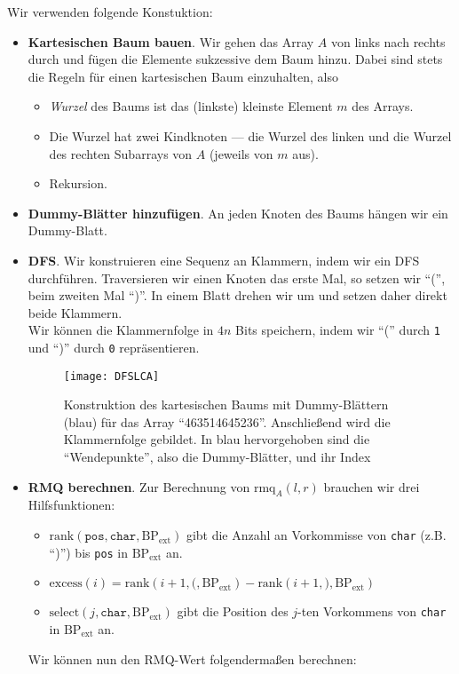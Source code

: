 Wir verwenden folgende Konstuktion:

\begin{itemize}
  \item \textbf{Kartesischen Baum bauen}. \quad Wir gehen das Array \( A \) von links nach rechts durch und fügen die Elemente sukzessive dem Baum hinzu. Dabei sind stets die Regeln für einen kartesischen Baum einzuhalten, also
  \begin{itemize}
    \item \emph{Wurzel} des Baums ist das (linkste) kleinste Element \( m \) des Arrays.
    \item Die Wurzel hat zwei Kindknoten --- die Wurzel des linken und die Wurzel des rechten Subarrays von \( A \) (jeweils von \( m \) aus).
    \item Rekursion.
  \end{itemize}
  \item \textbf{Dummy-Blätter hinzufügen}. \quad An jeden Knoten des Baums hängen wir ein Dummy-Blatt.
  \item \textbf{DFS}. \quad Wir konstruieren eine Sequenz an Klammern, indem wir ein DFS durchführen. Traversieren wir einen Knoten das erste Mal, so setzen wir ``('', beim zweiten Mal ``)''. In einem Blatt drehen wir um und setzen daher direkt beide Klammern. \\

  Wir können die Klammernfolge in \( 4n \) Bits speichern, indem wir ``('' durch \texttt{1} und ``)'' durch \texttt{0} repräsentieren.

  \begin{figure}[H]
    \texttt{[image: DFSLCA]}
    \caption{Konstruktion des kartesischen Baums mit Dummy-Blättern (blau) für das Array ``463514645236''. Anschließend wird die Klammernfolge gebildet. In blau hervorgehoben sind die ``Wendepunkte'', also die Dummy-Blätter, und ihr Index}
  \end{figure}

  \item \textbf{RMQ berechnen}. \quad Zur Berechnung von \( \text{rmq}_A(l,r) \) brauchen wir drei Hilfsfunktionen:
  \begin{itemize}
    \item \( \text{rank}(\texttt{pos}, \texttt{char}, \text{BP}_{\text{ext}}) \) gibt die Anzahl an Vorkommisse von \texttt{char} (z.B. ``)'') bis \texttt{pos} in \( \text{BP}_{\text{ext}} \) an.
    \item \( \text{excess}(i) = \text{rank}(i+1, \texttt{(}, \text{BP}_{\text{ext}}) - \text{rank}(i+1, \texttt{)}, \text{BP}_{\text{ext}}) \)
    \item \( \text{select}(j, \texttt{char}, \text{BP}_{\text{ext}}) \) gibt die Position des \( j \)-ten Vorkommens von \texttt{char} in \( \text{BP}_{\text{ext}} \) an.
  \end{itemize}
  Wir können nun den RMQ-Wert folgendermaßen berechnen:


\end{itemize}
